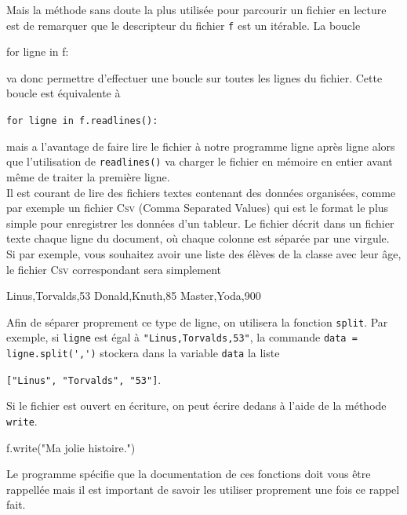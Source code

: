 \documentclass{magnoliaold}
\begin{document}
Mais la méthode sans doute la plus utilisée pour parcourir un fichier
en lecture est de remarquer que le descripteur du fichier \verb!f! est un itérable.
La boucle
\begin{pythoncode}
for ligne in f:
\end{pythoncode}
va donc permettre d'effectuer une boucle sur toutes les lignes du fichier. Cette boucle
est équivalente à
\begin{center}
  \verb!for ligne in f.readlines():!
\end{center}
mais a l'avantage de faire lire le fichier à notre programme ligne après ligne alors que
l'utilisation de \verb!readlines()! va charger le fichier en mémoire en entier avant même
de traiter la première ligne.\\

Il est courant de lire des fichiers textes contenant des données organisées, comme
par exemple un fichier \textsc{Csv} (Comma Separated Values) qui est le format le
plus simple pour enregistrer les données d'un tableur. Le fichier décrit dans un fichier
texte chaque ligne du document, où chaque colonne est séparée par une virgule. Si par
exemple, vous souhaitez avoir une liste des élèves de la classe avec leur âge, le fichier
\textsc{Csv} correspondant sera simplement
\begin{pythoncode}
Linus,Torvalds,53
Donald,Knuth,85
Master,Yoda,900
\end{pythoncode}
Afin de séparer proprement ce type de ligne, on utilisera la fonction \verb!split!.
Par exemple, si \verb!ligne! est égal à \verb!"Linus,Torvalds,53"!, la commande
\verb!data = ligne.split(',')! stockera dans la variable \verb!data! la liste
\begin{center}
\verb!["Linus", "Torvalds", "53"]!.
\end{center}

Si le fichier est ouvert en écriture, on peut écrire dedans à l'aide de la méthode
\verb!write!.
\begin{pythoncode}
f.write("Ma jolie histoire.")
\end{pythoncode}

\medskip
Le programme spécifie que la documentation de ces fonctions doit vous être rappellée
mais il est important de savoir les utiliser proprement une fois ce rappel fait.


\end{document}
